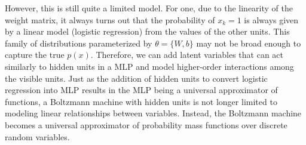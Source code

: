   However, this is still quite a limited model. For one, due to the linearity of the weight matrix, it always turns out that the probability of $x_k = 1$ is always given by a linear model (logistic regression) from the values of the other units. This family of distributions parameterized by $\theta = \{W, b\}$ may not be broad enough to capture the true $p(x)$. Therefore, we can add latent variables that can act similarly to hidden units in a MLP and model higher-order interactions among the visible units. Just as the addition of hidden units to convert logistic regression into MLP results in the MLP being a universal approximator of functions, a Boltzmann machine with hidden units is not longer limited to modeling linear relationships between variables. Instead, the Boltzmann machine becomes a universal approximator of probability mass functions over discrete random variables. 

